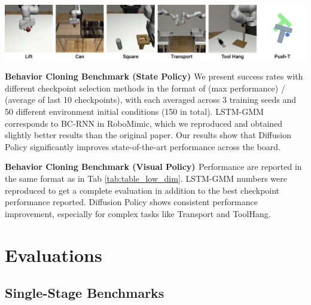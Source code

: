 
\begin{table}[h]

~~~~~~~~~~~~~~~~~~~~~~~~~~~~
\includegraphics[width=0.82\linewidth]{figure/sim_task_thumbnails.pdf}
\label{tab:sim_benchmark_state}

\vspace{1mm}
{
\centering


\caption{\textbf{Behavior Cloning Benchmark (State Policy) \label{tab:table_low_dim} }
We present success rates with different checkpoint selection methods in the format of (max performance) / (average of last 10 checkpoints), with each averaged across 3 training seeds and 50 different environment initial conditions (150 in total).
LSTM-GMM corresponds to BC-RNN in RoboMimic\cite{robomimic}, which we reproduced and obtained slightly {better} results than the original paper. Our results show that Diffusion Policy significantly improves state-of-the-art performance across the board.
}
\vspace{2mm}



\caption{\textbf{Behavior Cloning Benchmark (Visual Policy) \label{tab:table_image}} Performance are reported in the same format as in Tab \ref{tab:table_low_dim}. LSTM-GMM numbers were reproduced to get a complete evaluation in addition to the best checkpoint performance reported. Diffusion Policy shows consistent performance improvement, especially for complex tasks like Transport and ToolHang. }
}
\end{table}


\section{Evaluations}
 



\subsection{Single-Stage Benchmarks}
